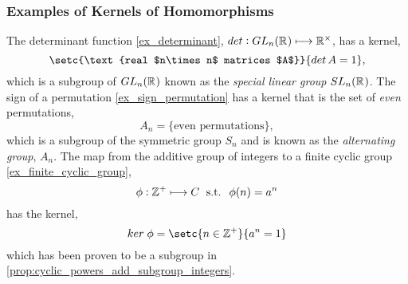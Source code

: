 \documentclass[MathsNotesBase.tex]{subfiles}
\begin{document}
{	\subsubsection{Examples of Kernels of Homomorphisms}
	\begin{exe}
		\ex The determinant function \ref{ex_determinant}, $ det : GL_n(\mathbb{R}^{}) \longmapsto \mathbb{R}^{\times} $, has a kernel,
		\[ \setc{\text{real $n\times n$ matrices $A$}}{det \, A = 1}, \]
		which is a subgroup of $GL_n(\mathbb{R}^{})$ known as the \textit{special linear group} $SL_n(\mathbb{R}^{})$.
		\label{ex_special_lin_group}
		\ex The sign of a permutation \ref{ex_sign_permutation} has a kernel that is the set of \textit{even} permutations,
		\[ A_n = \{\text{even permutations}\}, \]
		which is a subgroup of the symmetric group $S_n$ and is known as the \textit{alternating group}, $A_n$.
		\label{ex_alternating_group}
		\ex The map from the additive group of integers to a finite cyclic group \ref{ex_finite_cyclic_group},
		\[ \phi : \mathbb{Z}^{+} \longmapsto C \; \text{ s.t. } \; \phi(n) = a^n \]
		has the kernel,
		\[ ker \; \phi = \setc{n \in \Z{+}}{a^n = 1} \]
		which has been proven to be a subgroup in \autoref{prop:cyclic_powers_add_subgroup_integers}.
		\label{ex_kernel_cyclic_powers}
	\end{exe}
}
\end{document}
